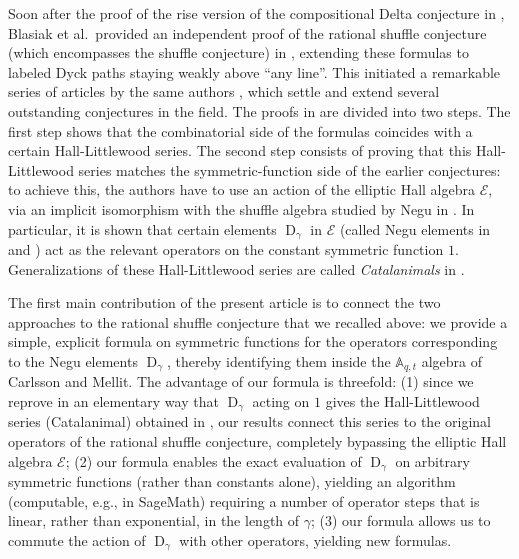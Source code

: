 \documentclass[reqno]{amsart}
\theoremstyle{plain}
\theoremstyle{definition}
\theoremstyle{remark}
\DeclareMathOperator{\D}{D}
\newcommand{\A}{\mathbb{A}}%
\newcommand{\<}{\langle}
\renewcommand{\>}{\rangle}
\begin{document}
Soon after the proof of the rise version of the compositional Delta conjecture in \cite{DAdderioMellit2022CompositionalDelta}, Blasiak et al.\ provided an independent proof of the rational shuffle conjecture (which encompasses the shuffle conjecture) in \cite{BHMPS2023ShuffleAnyLine}, extending these formulas to labeled Dyck paths staying weakly above ``any line''. This initiated a remarkable series of articles by the same authors \cites{BHMPS2023ProofExtendedDelta,BHMPS2024LLT,BHMPS2025LoehrWarrington,BHMPS2025RaisingOperatorFormula}, which settle and extend several outstanding conjectures in the field. The proofs in \cite{BHMPS2023ShuffleAnyLine} are divided into two steps. The first step shows that the combinatorial side of the formulas coincides with a certain Hall-Littlewood series. The second step consists of proving that this Hall-Littlewood series matches the symmetric-function side of the earlier conjectures: to achieve this, the authors have to use an action of the elliptic Hall algebra $\mathcal{E}$, via an implicit isomorphism with the shuffle algebra studied by Negu in \cite{Negut2014ShuffleAlgebra}. In particular, it is shown that certain elements $\D_\gamma$ in $\mathcal{E}$ (called Negu elements in \cites{BHMPS2023ShuffleAnyLine,BHMPS2023ProofExtendedDelta} and \cite{BenDaliBonzomDoulega2026PathOperators}) act as the relevant operators on the constant symmetric function $1$. Generalizations of these Hall-Littlewood series are called \emph{Catalanimals} in \cites{BHMPS2024LLT,BHMPS2025LoehrWarrington,BHMPS2025RaisingOperatorFormula}.

The first main contribution of the present article is to connect the two approaches to the rational shuffle conjecture that we recalled above: we provide a simple, explicit formula on symmetric functions for the operators corresponding to the Negu elements $\D_\gamma$, thereby identifying them inside the $\A_{q,t}$ algebra of Carlsson and Mellit. The advantage of our formula is threefold: (1) since we reprove in an elementary way that $\D_\gamma$ acting on $1$ gives the Hall-Littlewood series (Catalanimal) obtained in \cite{BHMPS2023ShuffleAnyLine}, our results connect this series to the original operators of the rational shuffle conjecture, completely bypassing the elliptic Hall algebra $\mathcal{E}$; (2) our formula enables the exact evaluation of $\D_\gamma$ on arbitrary symmetric functions (rather than constants alone), yielding an algorithm (computable, e.g., in SageMath) requiring a number of operator steps that is linear, rather than exponential, in the length of $\gamma$; (3) our formula allows us to commute the action of $\D_\gamma$ with other operators, yielding new formulas.
\end{document}
